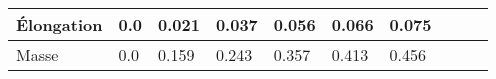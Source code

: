 \documentclass{standalone}
\begin{document}
\begin{tabular}{llllllllll}
	Élongation  & 0.0 & 0.021 & 0.037 & 0.056  & 0.066 & 0.075\\
	\hline
	Masse & 0.0 	 & 0.159 &  0.243 & 0.357 & 0.413 & 0.456 	
\end{tabular}
\end{document}
